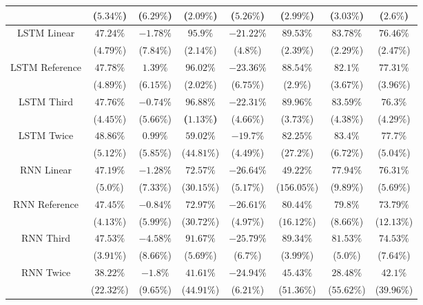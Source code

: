 \begin{table}[!ht]
{\begin{tabular}{|c|c|c|c|c|c|c|c|}
			 & ($5.34\%$) & ($6.29\%$) & ($2.09\%$) & ($5.26\%$) & ($2.99\%$) & ($3.03\%$) & ($2.6\%$) \\ \hline
			\multirow{2}{*}{LSTM Linear} & $47.24\%$ & $-1.78\%$ & $95.9\%$ & $-21.22\%$ & $89.53\%$ & $83.78\%$ & $76.46\%$ \\
			 & ($4.79\%$) & ($7.84\%$) & ($2.14\%$) & ($4.8\%$) & ($2.39\%$) & ($2.29\%$) & ($2.47\%$) \\ \hline
			\multirow{2}{*}{LSTM Reference} & $47.78\%$ & $1.39\%$ & $96.02\%$ & $-23.36\%$ & $88.54\%$ & $82.1\%$ & $77.31\%$ \\
			 & ($4.89\%$) & ($6.15\%$) & ($2.02\%$) & ($6.75\%$) & ($2.9\%$) & ($3.67\%$) & ($3.96\%$) \\ \hline
			\multirow{2}{*}{LSTM Third} & $47.76\%$ & $-0.74\%$ & $\mathbf{96.88\%}$ & $-22.31\%$ & $89.96\%$ & $83.59\%$ & $76.3\%$ \\
			 & ($4.45\%$) & ($5.66\%$) & \textbf{(}$\mathbf{1.13\%}$\textbf{)} & ($4.66\%$) & ($3.73\%$) & ($4.38\%$) & ($4.29\%$) \\ \hline
			\multirow{2}{*}{LSTM Twice} & $48.86\%$ & $0.99\%$ & $59.02\%$ & $-19.7\%$ & $82.25\%$ & $83.4\%$ & $77.7\%$ \\
			 & ($5.12\%$) & ($5.85\%$) & ($44.81\%$) & ($4.49\%$) & ($27.2\%$) & ($6.72\%$) & ($5.04\%$) \\ \hline
			\multirow{2}{*}{RNN Linear} & $47.19\%$ & $-1.28\%$ & $72.57\%$ & $-26.64\%$ & $49.22\%$ & $77.94\%$ & $76.31\%$ \\
			 & ($5.0\%$) & ($7.33\%$) & ($30.15\%$) & ($5.17\%$) & ($156.05\%$) & ($9.89\%$) & ($5.69\%$) \\ \hline
			\multirow{2}{*}{RNN Reference} & $47.45\%$ & $-0.84\%$ & $72.97\%$ & $-26.61\%$ & $80.44\%$ & $79.8\%$ & $73.79\%$ \\
			 & ($4.13\%$) & ($5.99\%$) & ($30.72\%$) & ($4.97\%$) & ($16.12\%$) & ($8.66\%$) & ($12.13\%$) \\ \hline
			\multirow{2}{*}{RNN Third} & $47.53\%$ & $-4.58\%$ & $91.67\%$ & $-25.79\%$ & $89.34\%$ & $81.53\%$ & $74.53\%$ \\
			 & ($3.91\%$) & ($8.66\%$) & ($5.69\%$) & ($6.7\%$) & ($3.99\%$) & ($5.0\%$) & ($7.64\%$) \\ \hline
			\multirow{2}{*}{RNN Twice} & $38.22\%$ & $-1.8\%$ & $41.61\%$ & $-24.94\%$ & $45.43\%$ & $28.48\%$ & $42.1\%$ \\
			 & ($22.32\%$) & ($9.65\%$) & ($44.91\%$) & ($6.21\%$) & ($51.36\%$) & ($55.62\%$) & ($39.96\%$) \\ \hline

\end{tabular}}
\end{table}
